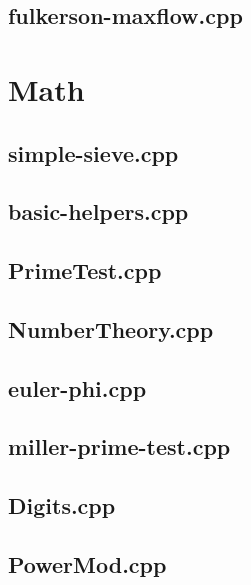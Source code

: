 \documentclass[10pt,twocolumn,landscape]{article}
\begin{document}
\subsection{fulkerson-maxflow.cpp}


\section{Math}

\subsection{simple-sieve.cpp}


\subsection{basic-helpers.cpp}


\subsection{PrimeTest.cpp}


\subsection{NumberTheory.cpp}


\subsection{euler-phi.cpp}


\subsection{miller-prime-test.cpp}


\subsection{Digits.cpp}


\subsection{PowerMod.cpp}

\end{document}
